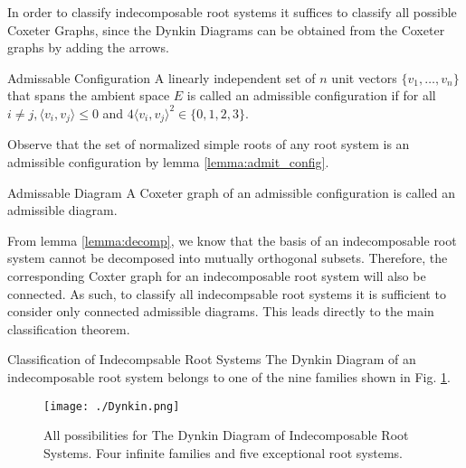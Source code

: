 In order to classify indecomposable root systems it suffices to classify all possible Coxeter Graphs,
since the Dynkin Diagrams can be obtained from the Coxeter graphs by adding the arrows. \newline

\begin{nameddefinition}{Admissable Configuration}
    A linearly independent set of $n$ unit vectors $\{v_1, \dots, v_n \}$ that spans the ambient space
    $E$ is called an admissible configuration if for all $i\not=j, \langle v_i, v_j \rangle \leq 0$
    and $4 \langle v_i, v_j \rangle^2 \in \{0, 1, 2, 3\}$.
\end{nameddefinition}

Observe that the set of normalized simple roots of any root system is an admissible configuration
by lemma \ref{lemma:admit_config}. \newline

\begin{nameddefinition}{Admissable Diagram}
    A Coxeter graph of an admissible configuration is called an admissible diagram.
\end{nameddefinition}

From lemma \ref{lemma:decomp}, we know that the basis of an indecomposable root system cannot be
decomposed into mutually orthogonal subsets.
Therefore, the corresponding Coxter graph for an indecomposable root system will also be connected.
As such, to classify all indecompsable root systems it is sufficient to consider only connected
admissible diagrams.
This leads directly to the main classification theorem. \newline

\begin{namedtheorem}{Classification of Indecompsable Root Systems}
    The Dynkin Diagram of an indecomposable root system belongs to one of the nine families
    shown in Fig. \ref{img:dynkin}.
\end{namedtheorem}

\begin{figure}[h]
    \label{img:dynkin}
    \centering
    \texttt{[image: ./Dynkin.png]}
    \caption{All possibilities for The Dynkin Diagram of Indecomposable Root Systems. Four infinite families and five exceptional root systems.}
\end{figure}


